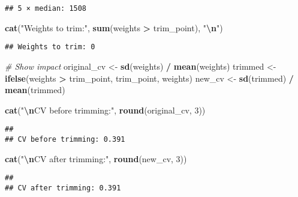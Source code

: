 \documentclass[
]{article}
\newenvironment{Shaded}{\begin{snugshade}}{\end{snugshade}}
\newcommand{\CommentTok}[1]{\textcolor[rgb]{0.56,0.35,0.01}{\textit{#1}}}
\newcommand{\DecValTok}[1]{\textcolor[rgb]{0.00,0.00,0.81}{#1}}
\newcommand{\FunctionTok}[1]{\textcolor[rgb]{0.13,0.29,0.53}{\textbf{#1}}}
\newcommand{\NormalTok}[1]{#1}
\newcommand{\OtherTok}[1]{\textcolor[rgb]{0.56,0.35,0.01}{#1}}
\newcommand{\SpecialCharTok}[1]{\textcolor[rgb]{0.81,0.36,0.00}{\textbf{#1}}}
\newcommand{\StringTok}[1]{\textcolor[rgb]{0.31,0.60,0.02}{#1}}
\begin{document}
\begin{verbatim}
## 5 × median: 1508
\end{verbatim}

\begin{Shaded}
\begin{Highlighting}[]
\FunctionTok{cat}\NormalTok{(}\StringTok{"Weights to trim:"}\NormalTok{, }\FunctionTok{sum}\NormalTok{(weights }\SpecialCharTok{\textgreater{}}\NormalTok{ trim\_point), }\StringTok{"}\SpecialCharTok{\textbackslash{}n}\StringTok{"}\NormalTok{)}
\end{Highlighting}
\end{Shaded}

\begin{verbatim}
## Weights to trim: 0
\end{verbatim}

\begin{Shaded}
\begin{Highlighting}[]
\CommentTok{\# Show impact}
\NormalTok{original\_cv }\OtherTok{\textless{}{-}} \FunctionTok{sd}\NormalTok{(weights) }\SpecialCharTok{/} \FunctionTok{mean}\NormalTok{(weights)}
\NormalTok{trimmed }\OtherTok{\textless{}{-}} \FunctionTok{ifelse}\NormalTok{(weights }\SpecialCharTok{\textgreater{}}\NormalTok{ trim\_point, trim\_point, weights)}
\NormalTok{new\_cv }\OtherTok{\textless{}{-}} \FunctionTok{sd}\NormalTok{(trimmed) }\SpecialCharTok{/} \FunctionTok{mean}\NormalTok{(trimmed)}

\FunctionTok{cat}\NormalTok{(}\StringTok{"}\SpecialCharTok{\textbackslash{}n}\StringTok{CV before trimming:"}\NormalTok{, }\FunctionTok{round}\NormalTok{(original\_cv, }\DecValTok{3}\NormalTok{))}
\end{Highlighting}
\end{Shaded}

\begin{verbatim}
## 
## CV before trimming: 0.391
\end{verbatim}

\begin{Shaded}
\begin{Highlighting}[]
\FunctionTok{cat}\NormalTok{(}\StringTok{"}\SpecialCharTok{\textbackslash{}n}\StringTok{CV after trimming:"}\NormalTok{, }\FunctionTok{round}\NormalTok{(new\_cv, }\DecValTok{3}\NormalTok{))}
\end{Highlighting}
\end{Shaded}

\begin{verbatim}
## 
## CV after trimming: 0.391
\end{verbatim}
\end{document}
